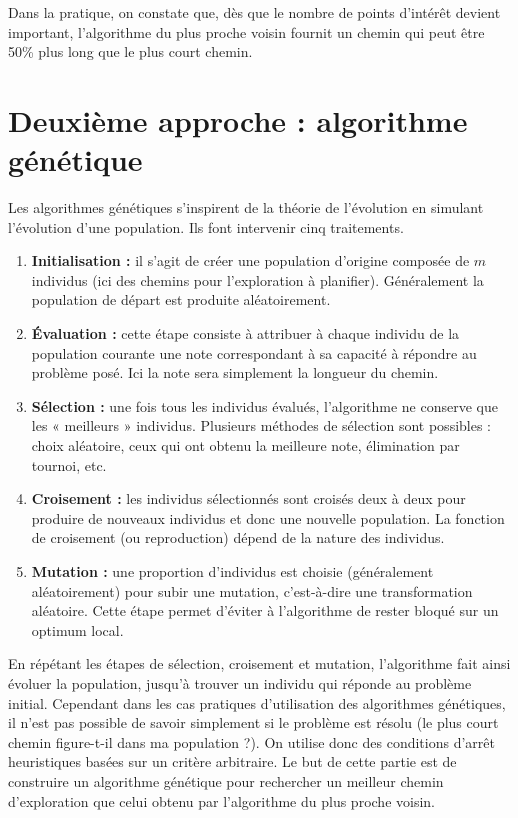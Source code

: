 \ifprof
\else
Dans la pratique, on constate que, dès que le nombre de points d’intérêt devient important, l’algorithme du
plus proche voisin fournit un chemin qui peut être 50\% plus long que le plus court chemin.
\fi
\section{Deuxième approche : algorithme génétique}

\ifprof
\else
Les algorithmes génétiques s’inspirent de la théorie de l’évolution en simulant l’évolution d’une population. Ils
font intervenir cinq traitements.
\begin{enumerate}
\item \textbf{Initialisation :} il s’agit de créer une population d’origine composée de $m$ individus (ici des chemins pour l’exploration à
planifier). Généralement la population de départ est produite aléatoirement.
\item \textbf{Évaluation :} cette étape consiste à attribuer à chaque individu de la population courante une note correspondant à sa
capacité à répondre au problème posé. Ici la note sera simplement la longueur du chemin.
\item \textbf{Sélection :} une fois tous les individus évalués, l’algorithme ne conserve que les « meilleurs » individus. Plusieurs méthodes
de sélection sont possibles : choix aléatoire, ceux qui ont obtenu la meilleure note, élimination par
tournoi, etc.
\item \textbf{Croisement :} les individus sélectionnés sont croisés deux à deux pour produire de nouveaux individus et donc une nouvelle
population. La fonction de croisement (ou reproduction) dépend de la nature des individus.
\item \textbf{Mutation :} une proportion d’individus est choisie (généralement aléatoirement) pour subir une mutation, c’est-à-dire
une transformation aléatoire. Cette étape permet d’éviter à l’algorithme de rester bloqué sur un optimum
local.
\end{enumerate}
En répétant les étapes de sélection, croisement et mutation, l’algorithme fait ainsi évoluer la population, jusqu’à
trouver un individu qui réponde au problème initial. Cependant dans les cas pratiques d’utilisation des
algorithmes génétiques, il n’est pas possible de savoir simplement si le problème est résolu (le plus court chemin
figure-t-il dans ma population ?). On utilise donc des conditions d’arrêt heuristiques basées sur un critère
arbitraire.
Le but de cette partie est de construire un algorithme génétique pour rechercher un meilleur chemin d’exploration
que celui obtenu par l’algorithme du plus proche voisin.

